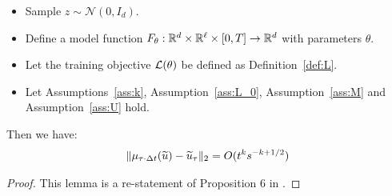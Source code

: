 \begin{lemma}
\begin{itemize}
        \item Sample $z \sim \mathcal{N}(0, I_d)$.
        \item Define a model function $F_\theta: \mathbb{R}^d \times \mathbb{R}^\ell \times [0, T] \rightarrow \mathbb{R}^d$ with parameters $\theta$.
        \item Let the training objective ${\cal L}(\theta)$ be defined as Definition~\ref{def:L}.
        \item Let Assumptions~\ref{ass:k}, Assumption~\ref{ass:L_0}, Assumption~\ref{ass:M} and Assumption~\ref{ass:U} hold.
    \end{itemize}
    Then we have:
    \begin{align*}
        \| \mu_{\tau \cdot \Delta t}(\widetilde{u}) - \widetilde{u}_\tau \|_2 = O(t^{k}s^{-k+1/2})
    \end{align*}
\end{lemma}

\begin{proof}
    This lemma is a re-statement of Proposition 6 in \cite{gde+20}.
\end{proof}

